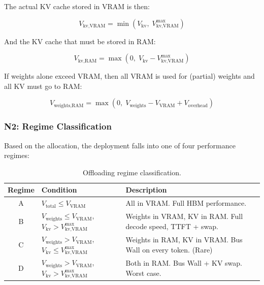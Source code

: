\documentclass[11pt,a4paper]{article}
\theoremstyle{definition}
\begin{document}
The actual KV cache stored in VRAM is then:

\begin{equation}\label{eq:kv_vram_actual}
V_{\text{kv,VRAM}} = \min(V_{\text{kv}}, \; V_{\text{kv,VRAM}}^{\max})
\end{equation}

And the KV cache that must be stored in RAM:

\begin{equation}\label{eq:kv_ram}
V_{\text{kv,RAM}} = \max(0, \; V_{\text{kv}} - V_{\text{kv,VRAM}}^{\max})
\end{equation}

If weights alone exceed VRAM, then all VRAM is used for (partial) weights and all KV must go to RAM:

\begin{equation}\label{eq:weights_ram}
V_{\text{weights,RAM}} = \max(0, \; V_{\text{weights}} - V_{\text{VRAM}} + V_{\text{overhead}})
\end{equation}

\subsubsection{N2: Regime Classification}

Based on the allocation, the deployment falls into one of four performance regimes:

\begin{table}[htbp]
\centering
\caption{Offloading regime classification.}\label{tab:regimes}
\begin{tabularx}{0.95\textwidth}{clX}
\toprule
\textbf{Regime} & \textbf{Condition} & \textbf{Description} \\
\midrule
A & $V_{\text{total}} \leq V_{\text{VRAM}}$ & All in VRAM. Full HBM performance. \\
B & $V_{\text{weights}} \leq V_{\text{VRAM}}$, $V_{\text{kv}} > V_{\text{kv,VRAM}}^{\max}$ & Weights in VRAM, KV in RAM. Full decode speed, TTFT + swap. \\
C & $V_{\text{weights}} > V_{\text{VRAM}}$, $V_{\text{kv}} \leq V_{\text{kv,VRAM}}^{\max}$ & Weights in RAM, KV in VRAM. Bus Wall on every token. (Rare) \\
D & $V_{\text{weights}} > V_{\text{VRAM}}$, $V_{\text{kv}} > V_{\text{kv,VRAM}}^{\max}$ & Both in RAM. Bus Wall + KV swap. Worst case. \\
\bottomrule
\end{tabularx}
\end{table}
\end{document}
